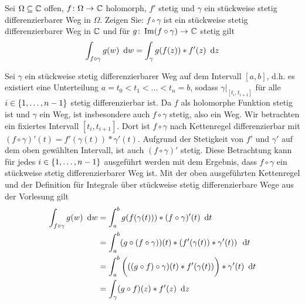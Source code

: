 \begin{exercisePage}
	\begin{task}
		Sei $\Omega \subseteq \mathbb{C}$ offen, $\abb{f}{\Omega}{\CC}$ holomorph, $f'$ stetig und $\gamma$ ein stückweise stetig differenzierbarer Weg in $\Omega$. Zeigen Sie: $f \circ \gamma$ ist ein stückweise stetig differenzierbarer Weg in $\mathbb{C}$ und für $\abb{g}{\Image (f \circ \gamma)}{\CC}$ stetig gilt
		\begin{equation*}
			\int_{f \circ \gamma} g(w) \enskip \mathrm{d}w = \int_\gamma g(f(z)) * f'(z) \enskip \mathrm{d}z
		\end{equation*}
	\end{task}
	Sei $\gamma$ ein stückweise stetig differenzierbarer Weg auf dem Intervall $[a,b]$, d.h. es existiert eine Unterteilung $a = t_0 < t_1 < \dots < t_n = b$, sodass $\gamma|_{[t_i, t_{i+1}]}$ für alle $i \in \left\{ 1, \dots, n-1 \right\}$ stetig differenzierbar ist. Da $f$ als holomorphe Funktion stetig ist und $\gamma$ ein Weg, ist insbesondere auch $f \circ \gamma$ stetig, also ein Weg. Wir betrachten ein fixiertes Intervall $[t_i, t_{i+1}]$. Dort ist $f \circ \gamma$ nach Kettenregel differenzierbar mit $(f \circ \gamma)'(t) = f'(\gamma(t)) * \gamma'(t)$. Aufgrund der Stetigkeit von $f'$ und $\gamma'$ auf dem oben gewählten Intervall, ist auch $(f \circ \gamma)'$ stetig. Diese Betrachtung kann für jedes $i \in \left\{ 1, \dots, n-1 \right\}$ ausgeführt werden mit dem Ergebnis, dass $f \circ \gamma$ ein stückweise stetig differenzierbarer Weg ist. 
	Mit der oben ausgeführten Kettenregel und der Definition für Integrale über stückweise stetig differenzierbare Wege aus der Vorlesung gilt
	\begin{align*}
		\int_{f \circ \gamma} g(w) \enskip \mathrm{d}w 
		&= \int_a^b g(f(\gamma(t))) * (f \circ \gamma)'(t) \enskip \mathrm{d}t \\
		&= \int_a^b (g \circ (f \circ \gamma))(t) * \left( f'(\gamma(t)) * \gamma'(t) \right) \enskip \mathrm{d}t \\
		&= \int_a^b \bigg( ((g \circ f)\circ \gamma)(t) * f'(\gamma(t)) \bigg) * \gamma'(t) \enskip \mathrm{d}t \\
		&= \int_\gamma (g \circ f)(z) * f'(z) \enskip \mathrm{d}z
	\end{align*}
	

\end{exercisePage}
